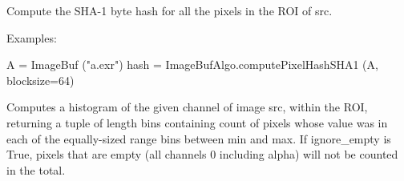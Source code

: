 \begin{comment}
Count how many pixels in the image (within the ROI) are outside the
value range described by {\cf low[roi.chbegin..roi.chend-1]} and
{\cf high[roi.chbegin..roi.chend-1]} 
as the low and high acceptable values for each color channel.  

The number of pixels containing values that fall below the lower bound
will be stored in {\cf *lowcount}, the number of pixels containing
values that fall above the upper bound will be stored in 
{\cf *highcount}, and the number of pixels for which all channels fell
within the bounds will be stored in {\cf *inrangecount}.  Any of these
may be NULL, which simply means that the counts need not be collected or
stored.

\smallskip
\noindent Examples:
\begin{code}
    A = ImageBuf ("a.exr")
    ROI roi = get_roi (A.spec())
    roi.chend = std::min (roi.chend, 4);  # only compare RGBA

    float low[] = {0, 0, 0, 0};
    float high[] = {1, 1, 1, 1};

    imagesize_t lowcount, highcount, inrangecount;
    ImageBufAlgo.color_range_check (A, &lowcount, &highcount, &inrangecount,
                                     low, high, roi);
    print lowcount, " pixels had components < 0"
    print highcount, " pixels had components > 1"
    print inrangecount, " pixels were fully within [0,1] range"
\end{code}
\apiend
\end{comment}


 

Compute the SHA-1 byte hash for all the pixels in the ROI of {\cf src}.

\smallskip
\noindent Examples:
\begin{code}
    A = ImageBuf ("a.exr")
    hash = ImageBufAlgo.computePixelHashSHA1 (A, blocksize=64)
\end{code}
\apiend


 
\apiend

Computes a histogram of the given {\cf channel} of image {\cf src}, within
the ROI, returning a tuple of length {\cf bins} containing count of pixels
whose value was in each of the equally-sized range bins between {\cf min}
and {\cf max}. If {\cf ignore_empty} is {\cf True}, pixels that are empty
(all channels 0 including alpha) will not be counted in the total.



